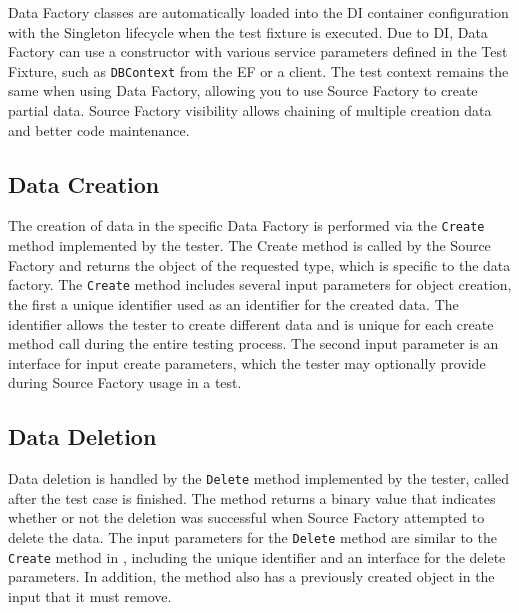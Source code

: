 Data Factory classes are automatically loaded into the \ac{DI} container configuration with the Singleton lifecycle when the test fixture is executed. Due to \ac{DI}, Data Factory can use a constructor with various service parameters defined in the Test Fixture, such as \texttt{DBContext} from the \ac{EF} or a client. The test context remains the same when using Data Factory, allowing you to use Source Factory to create partial data. Source Factory visibility allows chaining of multiple creation data and better code maintenance.

\subsection{Data Creation} \label{subsec:DataCreation}
The creation of data in the specific Data Factory is performed via the \texttt{Create} method implemented by the tester. The Create method is called by the Source Factory and returns the object of the requested type, which is specific to the data factory. The \texttt{Create} method includes several input parameters for object creation, the first a unique identifier used as an identifier for the created data. The identifier allows the tester to create different data and is unique for each create method call during the entire testing process. The second input parameter is an interface for input create parameters, which the tester may optionally provide during Source Factory usage in a test.

\subsection{Data Deletion}\label{subsec:DataDeletion}
Data deletion is handled by the \texttt{Delete} method implemented by the tester, called after the test case is finished. The method returns a binary value that indicates whether or not the deletion was successful when Source Factory attempted to delete the data. The input parameters for the \texttt{Delete} method are similar to the \texttt{Create} method in , including the unique identifier and an interface for the delete parameters. In addition, the method also has a previously created object in the input that it must remove.

